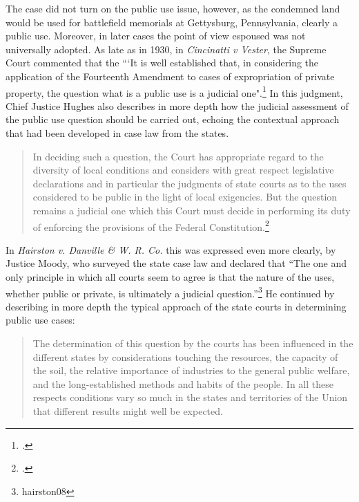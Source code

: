 The case did not turn on the public use issue, however, as the condemned land would be used for battlefield memorials at Gettysburg, Pennsylvania, clearly a public use. Moreover, in later cases the point of view espoused was not universally adopted. As late as in 1930, in {\it Cincinatti v Vester}, the Supreme Court commented that the ``‘It is well established that, in considering the application of the Fourteenth Amendment to cases of expropriation of private property, the question what is a public use is a judicial one".\footcite[447]{vester30} 
In this judgment, Chief Justice Hughes also describes in more depth how the judicial assessment of the public use question should be carried out, echoing the contextual approach that had been developed in case law from the states.

\begin{quote}
In deciding such a question, the Court has appropriate regard to the diversity of local conditions and considers with great respect legislative declarations and in particular the judgments of state courts as to the uses considered to be public in the light of local exigencies. But the question remains a judicial one which this Court must decide in performing its duty of enforcing the provisions of the Federal Constitution.\footcite[447]{vester30}
\end{quote}

In {\it Hairston v. Danville \& W. R. Co.} this was expressed even more clearly, by Justice Moody, who surveyed the state case law and declared that ``The one and only principle in which all courts seem to agree is that the nature of the uses, whether public or private, is ultimately a judicial question.''\footnote[606]{hairston08} He continued by describing in more depth the typical approach of the state courts in determining public use cases:

\begin{quote}
The determination of this question by the courts has been influenced in the different states by considerations touching the resources, the capacity of the soil, the relative importance of industries to the general public welfare, and the long-established methods and habits of the people. In all these respects conditions vary so much in the states and territories of the Union that different results might well be expected.
\end{quote}

